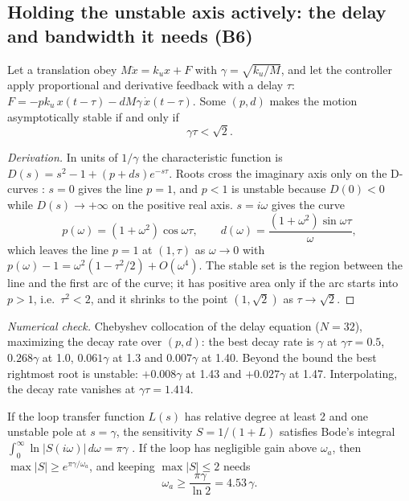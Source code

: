 \subsection{Holding the unstable axis actively: the delay and bandwidth it needs (B6)}
\begin{proposition}\label{prop:delay}
Let a translation obey $M\ddot x=k_ux+F$ with $\gamma=\sqrt{k_u/M}$, and let the controller apply proportional and derivative feedback with a
delay $\tau$: $F=-pk_u\,x(t-\tau)-dM\gamma\,\dot x(t-\tau)$. Some $(p,d)$ makes the motion asymptotically stable if and only if
\begin{equation}
\gamma\tau<\sqrt2 .\label{eq:delay}
\end{equation}
\end{proposition}
\begin{proof}[Derivation]
In units of $1/\gamma$ the characteristic function is $D(s)=s^2-1+(p+ds)e^{-s\tau}$. Roots cross the imaginary axis only on the D-curves
\cite{stepan89}: $s=0$ gives the line $p=1$, and $p<1$ is unstable because $D(0)<0$ while $D(s)\to+\infty$ on the positive real axis. $s=i\omega$
gives the curve
\[
p(\omega)=(1+\omega^2)\cos\omega\tau,\qquad d(\omega)=\frac{(1+\omega^2)\sin\omega\tau}{\omega},
\]
which leaves the line $p=1$ at $(1,\tau)$ as $\omega\to0$ with $p(\omega)-1=\omega^2(1-\tau^2/2)+O(\omega^4)$. The stable set is the region
between the line and the first arc of the curve; it has positive area only if the arc starts into $p>1$, i.e.\ $\tau^2<2$, and it shrinks to the
point $(1,\sqrt2)$ as $\tau\to\sqrt2$.
\end{proof}
\noindent\emph{Numerical check.} Chebyshev collocation of the delay equation \cite{breda05} ($N=32$), maximizing the decay rate over $(p,d)$: the
best decay rate is $\gamma$ at $\gamma\tau=0.5$, $0.268\gamma$ at 1.0, $0.061\gamma$ at 1.3 and $0.007\gamma$ at 1.40. Beyond the bound the
best rightmost root is unstable: $+0.008\gamma$ at 1.43 and $+0.027\gamma$ at 1.47. Interpolating, the decay rate vanishes at $\gamma\tau=1.414$.
\begin{proposition}[bandwidth]\label{prop:bode}
If the loop transfer function $L(s)$ has relative degree at least 2 and one unstable pole at $s=\gamma$, the sensitivity $S=1/(1+L)$ satisfies
Bode's integral $\int_0^\infty\ln|S(i\omega)|\,d\omega=\pi\gamma$ \cite{freudenberg85,stein03}. If the loop has negligible gain above $\omega_a$, then
$\max|S|\ge e^{\pi\gamma/\omega_a}$, and keeping $\max|S|\le2$ needs
\begin{equation}
\omega_a\ge\frac{\pi\gamma}{\ln2}=4.53\,\gamma .\label{eq:bodebw}
\end{equation}
\end{proposition}
